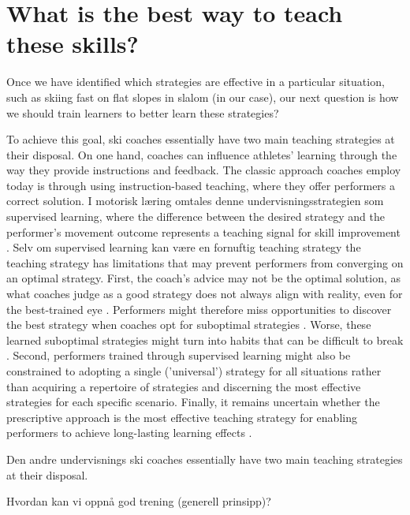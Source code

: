 \section{What is the best way to teach these skills?}
Once we have identified which strategies are effective in a particular situation, such as skiing fast on flat slopes in slalom (in our case), our next question is how we should train learners to better learn these strategies? 

To achieve this goal, ski coaches essentially have two main teaching strategies at their disposal. On one hand, coaches can influence athletes' learning through the way they provide instructions and feedback. The classic approach coaches employ today is through using instruction-based teaching, where they offer performers a correct solution. I motorisk læring omtales denne undervisningsstrategien som supervised learning, where the difference between the desired strategy and the performer's movement outcome represents a teaching signal for skill improvement  \cite{jordan_forward_1992, wolpert_motor_2010, doya_complementary_2000}. Selv om supervised learning kan være en fornuftig teaching strategy the teaching strategy has limitations that may prevent performers from converging on an optimal strategy. First, the coach's advice may not be the optimal solution, as what coaches judge as a good strategy does not always align with reality, even for the best-trained eye \cite{supej_impact_2019, cochrum_visual_2021}. Performers might therefore miss opportunities to discover the best strategy when coaches opt for suboptimal strategies \cite{gray_plateaus_2017}. Worse, these learned suboptimal strategies might turn into habits that can be difficult to break \cite{popp_effect_2020}. Second, performers trained through supervised learning might also be constrained to adopting a single ('universal') strategy for all situations rather than acquiring a repertoire of strategies and discerning the most effective strategies for each specific scenario. Finally, it remains uncertain whether the prescriptive approach is the most effective teaching strategy for enabling performers to achieve long-lasting learning effects \cite{wulf_instructions_1997, hodges_role_1999, williams_practice_2005,williams_effective_2023}. 




Den andre undervisnings ski coaches essentially have two main teaching strategies at their disposal.


Hvordan kan vi oppnå god trening (generell prinsipp)?



